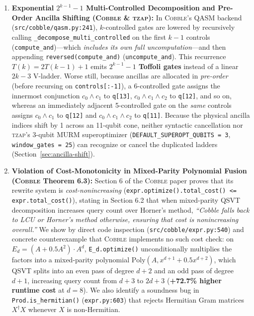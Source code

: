\documentclass[11pt,a4paper]{article}
\theoremstyle{definition}
\begin{document}
\begin{enumerate}
  \item \textbf{Exponential $2^{k-1}-1$ Multi-Controlled Decomposition and Pre-Order Ancilla Shifting (\textsc{Cobble} \& \textsc{tzap}):} In \textsc{Cobble}'s QASM backend (\texttt{src/cobble/qasm.py:241}), $k$-controlled gates are lowered by recursively calling \texttt{\_decompose\_multi\_controlled} on the first $k-1$ controls (\texttt{compute\_and})---which \emph{includes its own full uncomputation}---and then appending \texttt{reversed(compute\_and)} (\texttt{uncompute\_and}). This recurrence $T(k) = 2T(k-1) + 1$ emits \textbf{$2^{k-1}-1$ Toffoli gates} instead of a linear $2k-3$ V-ladder. Worse still, because ancillas are allocated in \emph{pre-order} (before recursing on \texttt{controls[:-1]}), a 6-controlled gate assigns the innermost conjunction $c_0 \land c_1$ to \texttt{q[13]}, $c_0 \land c_1 \land c_2$ to \texttt{q[12]}, and so on, whereas an immediately adjacent 5-controlled gate on the \emph{same} controls assigns $c_0 \land c_1$ to \texttt{q[12]} and $c_0 \land c_1 \land c_2$ to \texttt{q[11]}. Because the physical ancilla indices shift by 1 across an 11-qubit cone, neither syntactic cancellation nor \textsc{tzap}'s 3-qubit MURM superoptimizer (\texttt{DEFAULT\_SUPEROPT\_QUBITS = 3}, \texttt{window\_gates = 25}) can recognize or cancel the duplicated ladders (Section~\ref{sec:ancilla-shift}).
  \item \textbf{Violation of Cost-Monotonicity in Mixed-Parity Polynomial Fusion (\textsc{Cobble} Theorem 6.3):} Section 6 of the \textsc{Cobble} paper proves that its rewrite system is \emph{cost-nonincreasing} (\texttt{expr.optimize().total\_cost() <= expr.total\_cost()}), stating in Section 6.2 that when mixed-parity QSVT decomposition increases query count over Horner's method, \emph{``Cobble falls back to LCU or Horner's method otherwise, ensuring that cost is nonincreasing overall.''} We show by direct code inspection (\texttt{src/cobble/expr.py:540}) and concrete counterexample that \textsc{Cobble} implements no such cost check: on $E_d = (A + 0.5 A^2)\cdot A^d$, \texttt{E\_d.optimize()} unconditionally multiplies the factors into a mixed-parity polynomial $\mathrm{Poly}(A, x^{d+1} + 0.5 x^{d+2})$, which QSVT splits into an even pass of degree $d+2$ and an odd pass of degree $d+1$, increasing query count from $d+3$ to $2d+3$ (\textbf{+72.7\% higher runtime cost} at $d=8$). We also identify a soundness bug in \texttt{Prod.is\_hermitian()} (\texttt{expr.py:603}) that rejects Hermitian Gram matrices $X^\dagger X$ whenever $X$ is non-Hermitian.
\end{enumerate}
\end{document}
